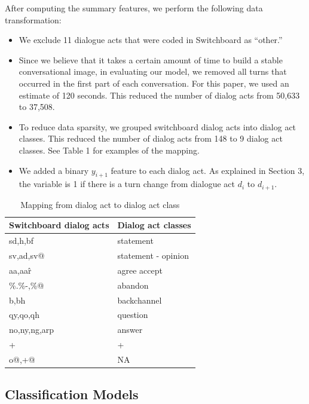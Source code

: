    After computing the summary features, we perform the following data transformation:
    \begin{itemize}[leftmargin=1em]
    \item We exclude 11 dialogue acts that were coded in Switchboard as ``other.''
    \item Since we believe that it takes a certain amount of time to build a stable conversational image, in evaluating our model, we removed all turns that occurred in the first part of each conversation. For this paper, we used an estimate of 120 seconds. This reduced the number of dialog acts from 50,633 to 37,508.
    \item To reduce data sparsity, we grouped switchboard dialog acts into dialog act classes. This reduced the number of dialog acts from 148 to 9 dialog act classes. See Table 1 for examples of the mapping.
    \item We added a binary $y_{i+1}$ feature to each dialog act. As explained in Section 3, the variable is 1 if there is a turn change from dialogue act $d_i$ to $d_{i+1}$.

    \end{itemize}
    \begin{table}
     \begin{center}
    \begin{tabular}{ |p{2cm}||p{3cm} | }
    \hline
Switchboard dialog acts &  Dialog act classes  \\
    \hline
sd,h,bf      & statement   \\
sv,ad,sv@    & statement - opinion  \\
aa,aa\^r     & agree accept \\
\%.\%-,\%@   & abandon      \\
b,bh         & backchannel  \\
qy,qo,qh     & question     \\
no,ny,ng,arp & answer       \\
+            & +            \\
o@,+@        & NA           \\
  \hline
\end{tabular}
\end{center}\vspace{-0.5em}
\caption{Mapping from dialog act to dialog act class}
\label{tab:mapping}
\end{table}


\subsection{Classification Models}

